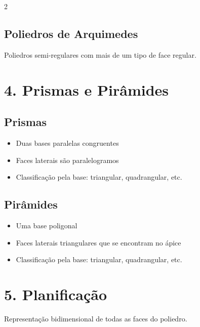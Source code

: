 \documentclass[11pt]{article}
\begin{document}
\begin{multicols}{2}
\subsection*{Poliedros de Arquimedes}
Poliedros semi-regulares com mais de um tipo de face regular.

\section*{4. Prismas e Pirâmides}
\subsection*{Prismas}
\begin{itemize}
    \item Duas bases paralelas congruentes
    \item Faces laterais são paralelogramos
    \item Classificação pela base: triangular, quadrangular, etc.
\end{itemize}

\subsection*{Pirâmides}
\begin{itemize}
    \item Uma base poligonal
    \item Faces laterais triangulares que se encontram no ápice
    \item Classificação pela base: triangular, quadrangular, etc.
\end{itemize}

\begin{center}
\end{center}

\section*{5. Planificação}
Representação bidimensional de todas as faces do poliedro.


\end{multicols}
\end{document}
